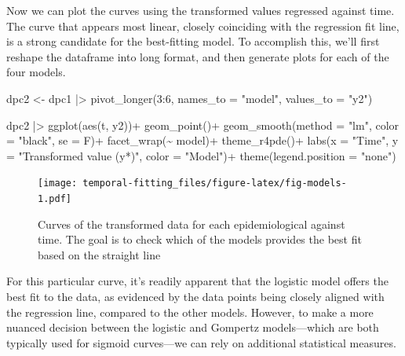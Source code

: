 \documentclass[
  letterpaper,
]{book}
\newenvironment{Shaded}{\begin{snugshade}}{\end{snugshade}}
\newcommand{\AttributeTok}[1]{\textcolor[rgb]{0.40,0.45,0.13}{#1}}
\newcommand{\DecValTok}[1]{\textcolor[rgb]{0.68,0.00,0.00}{#1}}
\newcommand{\FunctionTok}[1]{\textcolor[rgb]{0.28,0.35,0.67}{#1}}
\newcommand{\NormalTok}[1]{\textcolor[rgb]{0.00,0.23,0.31}{#1}}
\newcommand{\OtherTok}[1]{\textcolor[rgb]{0.00,0.23,0.31}{#1}}
\newcommand{\SpecialCharTok}[1]{\textcolor[rgb]{0.37,0.37,0.37}{#1}}
\newcommand{\StringTok}[1]{\textcolor[rgb]{0.13,0.47,0.30}{#1}}
\begin{document}
Now we can plot the curves using the transformed values regressed
against time. The curve that appears most linear, closely coinciding
with the regression fit line, is a strong candidate for the best-fitting
model. To accomplish this, we'll first reshape the dataframe into long
format, and then generate plots for each of the four models.

\begin{Shaded}
\begin{Highlighting}[]
\NormalTok{dpc2 }\OtherTok{\textless{}{-}}\NormalTok{ dpc1 }\SpecialCharTok{|\textgreater{}} 
  \FunctionTok{pivot\_longer}\NormalTok{(}\DecValTok{3}\SpecialCharTok{:}\DecValTok{6}\NormalTok{, }\AttributeTok{names\_to =} \StringTok{"model"}\NormalTok{, }\AttributeTok{values\_to =} \StringTok{"y2"}\NormalTok{) }


\NormalTok{dpc2 }\SpecialCharTok{|\textgreater{}} 
  \FunctionTok{ggplot}\NormalTok{(}\FunctionTok{aes}\NormalTok{(t, y2))}\SpecialCharTok{+}
  \FunctionTok{geom\_point}\NormalTok{()}\SpecialCharTok{+}
  \FunctionTok{geom\_smooth}\NormalTok{(}\AttributeTok{method =} \StringTok{"lm"}\NormalTok{, }\AttributeTok{color =} \StringTok{"black"}\NormalTok{, }\AttributeTok{se =}\NormalTok{ F)}\SpecialCharTok{+}
  \FunctionTok{facet\_wrap}\NormalTok{(}\SpecialCharTok{\textasciitilde{}}\NormalTok{ model)}\SpecialCharTok{+}
  \FunctionTok{theme\_r4pde}\NormalTok{()}\SpecialCharTok{+}
  \FunctionTok{labs}\NormalTok{(}\AttributeTok{x =} \StringTok{"Time"}\NormalTok{, }\AttributeTok{y =} \StringTok{"Transformed value (y*)"}\NormalTok{,}
       \AttributeTok{color =} \StringTok{"Model"}\NormalTok{)}\SpecialCharTok{+}
  \FunctionTok{theme}\NormalTok{(}\AttributeTok{legend.position =} \StringTok{"none"}\NormalTok{)}
\end{Highlighting}
\end{Shaded}

\begin{figure}

\texttt{[image: temporal-fitting\_files/figure-latex/fig-models-1.pdf]} \hfill{}

\caption{\label{fig-models}Curves of the transformed data for each
epidemiological against time. The goal is to check which of the models
provides the best fit based on the straight line}

\end{figure}

For this particular curve, it's readily apparent that the logistic model
offers the best fit to the data, as evidenced by the data points being
closely aligned with the regression line, compared to the other models.
However, to make a more nuanced decision between the logistic and
Gompertz models---which are both typically used for sigmoid curves---we
can rely on additional statistical measures.
\end{document}
